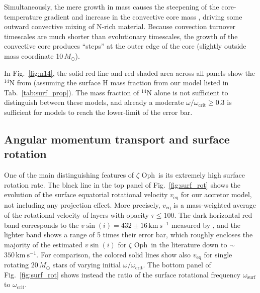 \documentclass[twocolumn,twocolappendix,trackchanges]{aastex63}
\newcommand{\kms}{{\mathrm{km\ s^{-1}}}}
\DeclareRobustCommand{\Figref}[1]{Fig.~\ref{#1}}
\DeclareRobustCommand{\Tabref}[1]{Tab.~\ref{#1}}
\newcommand{\zoph}{$\zeta$ Oph}
\begin{document}
Simultaneously, the mere growth in mass causes the steepening of the
core-temperature gradient and increase in the convective core mass
\citep[rejuvenation, e.g.,][]{schneider:16}, driving some outward convective mixing
of N-rich material. Because convection turnover timescales are much
shorter than evolutionary timescales, the growth of the convective
core produces ``steps'' at the outer edge of the core (slightly
outside mass coordinate 10\,$M_\odot$).

In \Figref{fig:n14}, the solid red line and red shaded area across all panels show the
$^{14}\mathrm{N}$ from  (assuming the
surface H mass fraction from our model listed in
\Tabref{tab:surf_prop}). The mass fraction of $^{14}\mathrm{N}$
alone is not sufficient to distinguish between these models, and already
a moderate $\omega/\omega_\mathrm{crit}\geq0.3$ is sufficient for
models to reach the lower-limit of the error bar.


\subsection{Angular momentum transport and surface rotation}
\label{sec:rot}

One of the main distinguishing features of \zoph\ is its extremely
high surface rotation rate.
The black line in the top panel of \Figref{fig:surf_rot} shows the
evolution of the surface equatorial rotational velocity
$v_\mathrm{eq}$ for our accretor model, not including any projection
effect. More precisely, $v_\mathrm{eq}$ is a mass-weighted average of
the rotational velocity of layers with opacity
$\tau\leq 100$. The dark horizontal red band corresponds to the
$v\sin(i)=432\pm16\,\kms$ measured by \cite{zehe:18}, and the lighter
band shows a range of 5 times their error bar, which roughly encloses
the majority of the estimated $v\sin(i)$ for \zoph\ in the literature
down to
$\sim$$350\,\kms$.  For comparison, the colored solid lines show also
$v_\mathrm{eq}$ for single rotating
$20\,M_\odot$ stars of varying initial
$\omega/\omega_\mathrm{crit}$.  The bottom panel of \Figref{fig:surf_rot} shows instead the ratio
of the surface rotational frequency $\omega_\mathrm{surf}$ to $\omega_\mathrm{crit}$.
\end{document}
